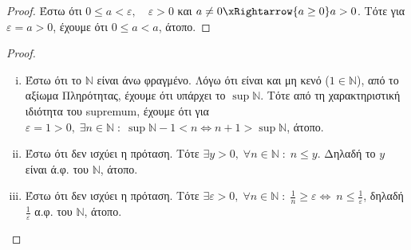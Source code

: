 \documentclass[main.tex]{subfiles}
\begin{document}
\begin{proof}
\item {}
  Έστω ότι $ 0 \leq a < \varepsilon, \quad \varepsilon >0 $ και 
  $ a \neq 0 \xRightarrow{a \geq 0} a > 0$. Τότε για $ \varepsilon = 
  a > 0$, έχουμε ότι $ 0 \leq a < a $, άτοπο.
\end{proof}




\begin{proof}
\item {}
  \begin{enumerate}[i)]
    \item Έστω ότι το $ \mathbb{N} $ είναι άνω φραγμένο. Λόγω ότι 
      είναι και μη κενό ($ 1 \in \mathbb{N} $), από το αξίωμα 
      Πληρότητας, έχουμε ότι υπάρχει το $ \sup \mathbb{N} $. 
      Τότε από τη χαρακτηριστική ιδιότητα του supremum, έχουμε 
      ότι για $ \varepsilon = 1 >0, \; \exists n \in \mathbb{N} 
      \; : \; \sup \mathbb{N}-1 < n \Leftrightarrow n+1 > \sup
      \mathbb{N} $, άτοπο.

    \item Έστω ότι δεν ισχύει η πρόταση. Τότε  $ \exists y >0, \; 
      \forall n \in \mathbb{N} \; : \; n \leq y$. Δηλαδή
      το  $y$  είναι ά.φ. του $\mathbb{N}$, άτοπο.

    \item Έστω ότι δεν ισχύει η πρόταση. Τότε $ \exists 
      \varepsilon >0 , \; \forall n \in \mathbb{N} \; : \; 
      \frac{1}{n} \geq \varepsilon  \Leftrightarrow \ n \leq 
      \frac{1}{\varepsilon} $, δηλαδή $ \frac{1}{\varepsilon} $ 
      α.φ. του $ \mathbb{N} $, άτοπο. 
  \end{enumerate}
\end{proof}
\end{document}
